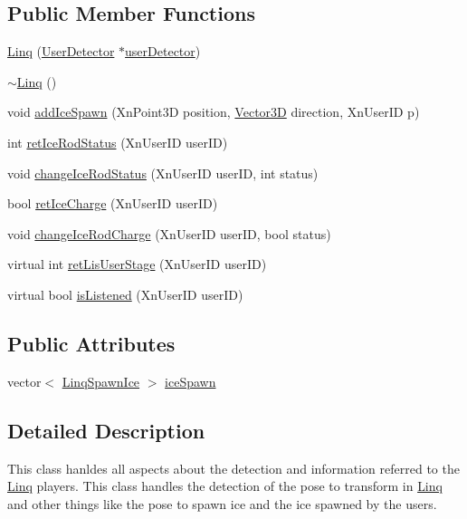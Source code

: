 \subsection*{Public Member Functions}
\begin{DoxyCompactItemize}
\item 
\hyperlink{classLinq_abd5cf38c179739fd6bbc1b30cfc319fc}{Linq} (\hyperlink{classUserDetector}{UserDetector} $\ast$\hyperlink{classAbstractPoseDetection_a20dccd0d1494d1ef0ec896e996b5e70b}{userDetector})
\item 
\hyperlink{classLinq_ab33fc2c4487bf5f64ffb34630c147e9a}{$\sim$Linq} ()
\item 
void \hyperlink{classLinq_a0a47d35b795ff8ee0e43bcec1528c448}{addIceSpawn} (XnPoint3D position, \hyperlink{classVector3D}{Vector3D} direction, XnUserID p)
\item 
int \hyperlink{classLinq_a55ee00fafc766eecaac949772197892a}{retIceRodStatus} (XnUserID userID)
\item 
void \hyperlink{classLinq_a5104de663be5b3dc0a4d78ad28afb5c3}{changeIceRodStatus} (XnUserID userID, int status)
\item 
bool \hyperlink{classLinq_a8bf61b41e6722b72da7e691e8e91f07b}{retIceCharge} (XnUserID userID)
\item 
void \hyperlink{classLinq_a035c5e48d36a6601d9234ac24c40e2c7}{changeIceRodCharge} (XnUserID userID, bool status)
\item 
virtual int \hyperlink{classLinq_a6994af326a734f473eae3983b32a5148}{retLisUserStage} (XnUserID userID)
\item 
virtual bool \hyperlink{classLinq_a55070b91120aa07225d64f8bd3136c11}{isListened} (XnUserID userID)
\end{DoxyCompactItemize}
\subsection*{Public Attributes}
\begin{DoxyCompactItemize}
\item 
vector$<$ \hyperlink{classLinqSpawnIce}{LinqSpawnIce} $>$ \hyperlink{classLinq_ac3cb5607d252c5462bfac2a5011bc41a}{iceSpawn}
\end{DoxyCompactItemize}


\subsection{Detailed Description}
This class hanldes all aspects about the detection and information referred to the \hyperlink{classLinq}{Linq} players. This class handles the detection of the pose to transform in \hyperlink{classLinq}{Linq} and other things like the pose to spawn ice and the ice spawned by the users. 

